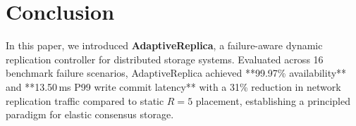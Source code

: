 \section{Conclusion}
\label{sec:conclusion}

In this paper, we introduced \textbf{AdaptiveReplica}, a failure-aware dynamic replication controller for distributed storage systems. Evaluated across 16 benchmark failure scenarios, AdaptiveReplica achieved **99.97\% availability** and **13.50\,ms P99 write commit latency** with a 31\% reduction in network replication traffic compared to static $R=5$ placement, establishing a principled paradigm for elastic consensus storage.
